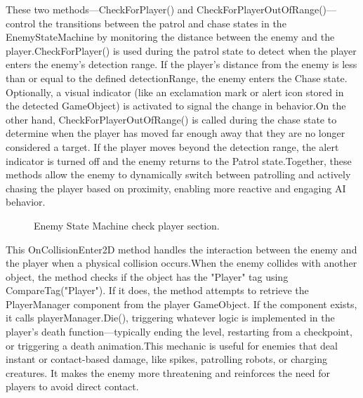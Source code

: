 \documentclass[12pt,oneside,openright,a4paper]{cpe-english-project}
\begin{document}
\newpage
These two methods—CheckForPlayer() and CheckForPlayerOutOfRange()—control the transitions between the patrol and chase states in the EnemyStateMachine by monitoring the distance between the enemy and the player.CheckForPlayer() is used during the patrol state to detect when the player enters the enemy's detection range. If the player’s distance from the enemy is less than or equal to the defined detectionRange, the enemy enters the Chase state. Optionally, a visual indicator (like an exclamation mark or alert icon stored in the detected GameObject) is activated to signal the change in behavior.On the other hand, CheckForPlayerOutOfRange() is called during the chase state to determine when the player has moved far enough away that they are no longer considered a target. If the player moves beyond the detection range, the alert indicator is turned off and the enemy returns to the Patrol state.Together, these methods allow the enemy to dynamically switch between patrolling and actively chasing the player based on proximity, enabling more reactive and engaging AI behavior.\par
 \begin{figure}[!h]
 \centering
\caption{Enemy State Machine check player section.}\label{fig:ESMcp}
\end{figure}
This OnCollisionEnter2D method handles the interaction between the enemy and the player when a physical collision occurs.When the enemy collides with another object, the method checks if the object has the "Player" tag using CompareTag("Player"). If it does, the method attempts to retrieve the PlayerManager component from the player GameObject. If the component exists, it calls playerManager.Die(), triggering whatever logic is implemented in the player's death function—typically ending the level, restarting from a checkpoint, or triggering a death animation.This mechanic is useful for enemies that deal instant or contact-based damage, like spikes, patrolling robots, or charging creatures. It makes the enemy more threatening and reinforces the need for players to avoid direct contact.\par
\end{document}
